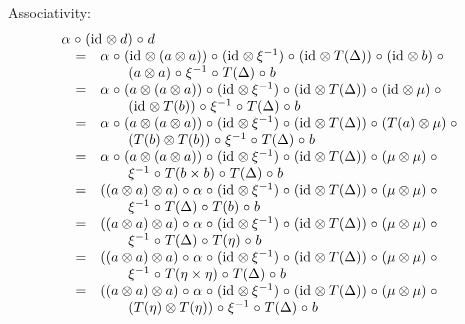 \documentclass{LMCS}
\newcommand{\after}{\mathrel{\circ}}
\newcommand{\idmap}[1][]{\ensuremath{\mathrm{id}_{#1}}}
\begin{document}
{Associativity:
$$\begin{array}{rcl}
\lefteqn{\alpha \after (\idmap\otimes d) \after d} \\
& = &
\alpha \after (\idmap \otimes (a \otimes a)) \after (\idmap \otimes \xi^{-1}) 
   \after (\idmap \otimes T(\Delta)) \after (\idmap \otimes b) \after \\
& & \qquad
   (a \otimes a) \after \xi^{-1} \after T(\Delta) \after b \\
& = &
\alpha \after (a \otimes (a \otimes a)) \after (\idmap \otimes \xi^{-1}) 
   \after (\idmap \otimes T(\Delta)) \after (\idmap \otimes \mu) \after \\
& & \qquad
   (\idmap \otimes T(b)) \after \xi^{-1} \after T(\Delta) \after b \\
& = &
\alpha \after (a \otimes (a \otimes a)) \after (\idmap \otimes \xi^{-1}) 
   \after (\idmap \otimes T(\Delta)) \after (T(a) \otimes \mu) \after \\
& & \qquad
   (T(b) \otimes T(b)) \after \xi^{-1} \after T(\Delta) \after b \\
& = &
\alpha \after (a \otimes (a \otimes a)) \after (\idmap \otimes \xi^{-1}) 
   \after (\idmap \otimes T(\Delta)) \after (\mu \otimes \mu) \after \\
& & \qquad
   \xi^{-1} \after T(b \times b) \after T(\Delta) \after b \\
& = &
((a \otimes a) \otimes a) \after \alpha \after (\idmap \otimes \xi^{-1}) 
   \after (\idmap \otimes T(\Delta)) \after (\mu \otimes \mu) \after \\
& & \qquad
   \xi^{-1} \after T(\Delta) \after T(b) \after b \\
& = &
((a \otimes a) \otimes a) \after \alpha \after (\idmap \otimes \xi^{-1}) 
   \after (\idmap \otimes T(\Delta)) \after (\mu \otimes \mu) \after \\
& & \qquad
   \xi^{-1} \after T(\Delta) \after T(\eta) \after b \\
& = &
((a \otimes a) \otimes a) \after \alpha \after (\idmap \otimes \xi^{-1}) 
   \after (\idmap \otimes T(\Delta)) \after (\mu \otimes \mu) \after \\
& & \qquad
   \xi^{-1} \after T(\eta\times\eta) \after T(\Delta) \after b \\
& = &
((a \otimes a) \otimes a) \after \alpha \after (\idmap \otimes \xi^{-1}) 
   \after (\idmap \otimes T(\Delta)) \after (\mu \otimes \mu) \after \\
& & \qquad
   (T(\eta)\otimes T(\eta)) \after \xi^{-1} \after T(\Delta) \after b \\

\end{array}$$}
\end{document}
